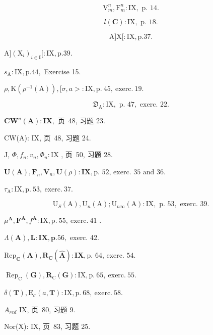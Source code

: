 \[
\mathrm{V} _ {m} ^ {n}, \mathrm{F} _ {m} ^ {n}: \mathrm{IX}, \text { p. } 14.
\]

\[
l (\mathbf {C}): \mathrm{IX}, \text { p. } 18.
\]

\[
\mathrm{A} ] \mathrm{X} [: \mathrm{IX}, \mathrm{p}. 37.
\]

\(\mathrm{A}]\left(\mathrm{X}_{i}\right)_{i\in \mathbf{I}}[: \mathrm{IX},\mathrm{p.}39.\)

\(s_{\mathrm{A}}:\mathrm{IX},\mathrm{p.}44,\) Exercise 15.

\(\rho,\mathrm{K}(\rho^{-1}(\mathrm{A})),[\sigma,a>:\mathrm{IX},\mathrm{p.~45,~exerc.~19}.\)

\[
\mathfrak {D} _ {\mathrm{A}}: \mathrm{IX}, \text { p. } 47, \text { exerc. } 22.
\]

\(\mathbf{CW}^u (\mathbf{A}):\mathbf{IX},\) 页~48, 习题 23.

CW(A): IX, 页~48, 习题 24.

J, \(\Phi, f_n, v_n, \Phi_n: \mathrm{IX}\) , 页~50, 习题 28.

\(\mathbf{U}(\mathbf{A}), \mathbf{F}_n, \mathbf{V}_n, \mathbf{U}(\rho) : \mathbf{IX}, \text{p. 52, exerc. 35 and 36.}\)

\(\tau_{\mathrm{A}}:\mathrm{IX},\mathrm{p.~53,~exerc.~37.}\)

\[
\mathrm{U} _ {S} (\mathrm{A}), \mathrm{U} _ {n} (\mathrm{A}); \mathrm{U} _ {n \infty} (\mathrm{A}): \mathrm{IX}, \text { p. } 53, \text { exerc. } 39.
\]

\(\mu^{\mathbf{A}}, \mathbf{F}^{\mathbf{A}}, f^{\mathbf{A}}: \mathrm{IX}, \mathrm{p.~55,~exerc.~41}\) .

\(\Lambda (\mathbf{A}),\mathbf{L}:\mathbf{IX},\mathbf{p}.56,\) exerc. 42.

\(\mathrm{Rep}_{\mathbf{C}}(\mathbf{A}), \mathbf{R}_{\mathbf{C}}(\mathbf{\hat{A}}) : \mathbf{IX}, \text{p. 64, exerc. 54.}\)

\(\operatorname{Rep}_{\mathrm{C}}(\mathbf{G}), \mathbf{R}_{\mathrm{C}}(\mathbf{G}) : \mathrm{IX}, \mathrm{p.~65,~exerc.~55}.\)

\(\delta (\mathbf{T}),\mathrm{E}_{\sigma}(a,\mathbf{T}):\mathrm{IX},\mathrm{p.~68,~exerc.~58.}\)

\(A_{red}\) IX, 页~80, 习题 9.

Nor(X): IX, 页~83, 习题 25.

